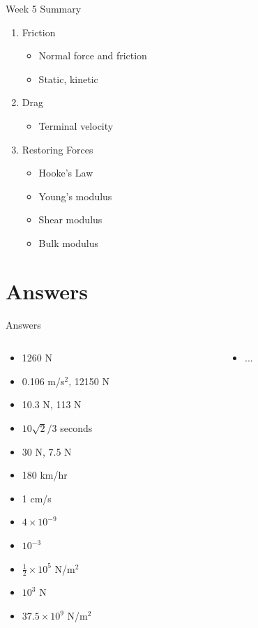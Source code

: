 \documentclass{beamer}
\begin{document}
\begin{frame}{Week 5 Summary}
\begin{enumerate}
\item \alert{Friction}
\begin{itemize}
\item Normal force and friction
\item Static, kinetic
\end{itemize}
\item \alert{Drag}
\begin{itemize}
\item Terminal velocity
\end{itemize}
\item \alert{Restoring Forces}
\begin{itemize}
\item Hooke's Law
\item Young's modulus
\item Shear modulus
\item Bulk modulus
\end{itemize}
\end{enumerate}
\end{frame}

\section{Answers}

\begin{frame}{Answers}
\begin{columns}[T]
\begin{column}{0.5\textwidth}
\begin{itemize}
\item 1260 N
\item 0.106 m/s$^2$, 12150 N
\item 10.3 N, 113 N
\item $10\sqrt{2}/3$ seconds
\item 30 N, 7.5 N
\item 180 km/hr
\item 1 cm/s
\item $4 \times 10^{-9}$
\item $10^{-3}$
\item $\frac{1}{2} \times 10^{5}$ N/m$^2$
\item $10^{3}$ N
\item $37.5 \times 10^{9}$ N/m$^2$ 
\end{itemize}
\end{column}
\begin{column}{0.5\textwidth}
\begin{itemize}
\item ...
\end{itemize}
\end{column}
\end{columns}
\end{frame}
\end{document}
